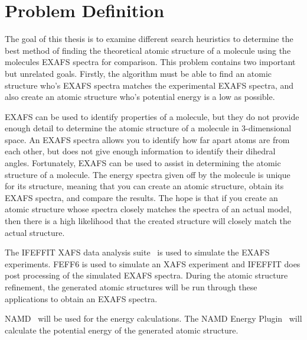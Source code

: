 

\section{Problem Definition}

The goal of this thesis is to examine different search heuristics to determine the best method of finding the theoretical atomic structure of a molecule using the molecules EXAFS spectra for comparison. This problem contains two important but unrelated goals. Firstly, the algorithm must be able to find an atomic structure who's EXAFS spectra matches the experimental EXAFS spectra, and also create an atomic structure who's potential energy is a low as possible.

EXAFS can be used to identify properties of a molecule, but they do not provide enough detail to determine the atomic structure of a molecule in 3-dimensional space. An EXAFS spectra allows you to identify how far apart atoms are from each other, but does not give enough information to identify their dihedral angles. Fortunately, EXAFS can be used to assist in determining the atomic structure of a molecule. The energy spectra given off by the molecule is unique for its structure, meaning that you can create an atomic structure, obtain its EXAFS spectra, and compare the results. The hope is that if you create an atomic structure whose spectra closely matches the spectra of an actual model, then there is a high likelihood that the created structure will closely match the actual structure.

The IFEFFIT XAFS data analysis suite~\cite{ifeffit} is used to simulate the EXAFS experiments. FEFF6 is used to simulate an XAFS experiment and IFEFFIT does post processing of the simulated EXAFS spectra. During the atomic structure refinement, the generated atomic structures will be run through these applications to obtain an EXAFS spectra.

NAMD~\cite{namd} will be used for the energy calculations. The NAMD Energy Plugin~\cite{namdEnergy}  will calculate the potential energy of the generated atomic structure.